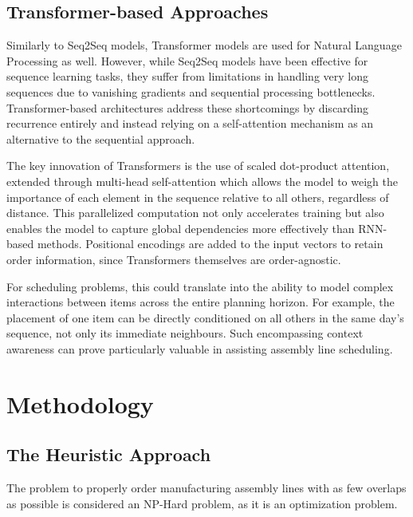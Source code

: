 \documentclass[12pt,a4paper]{report}
\begin{document}
\section{Transformer-based Approaches}

Similarly to Seq2Seq models, Transformer models are used for Natural Language Processing as well. However, while Seq2Seq models have been effective for sequence learning tasks, they suffer from limitations in handling very long sequences due to vanishing gradients and sequential processing bottlenecks. Transformer-based architectures address these shortcomings by discarding recurrence entirely and instead relying on a self-attention mechanism as an alternative to the sequential approach.

The key innovation of Transformers is the use of scaled dot-product attention, extended through multi-head self-attention which allows the model to weigh the importance of each element in the sequence relative to all others, regardless of distance. This parallelized computation not only accelerates training but also enables the model to capture global dependencies more effectively than RNN-based methods. Positional encodings are added to the input vectors to retain order information, since Transformers themselves are order-agnostic.\cite{ref5} 

For scheduling problems, this could translate into the ability to model complex interactions between items across the entire planning horizon. For example, the placement of one item can be directly conditioned on all others in the same day’s sequence, not only its immediate neighbours. Such encompassing context awareness can prove particularly valuable in assisting assembly line scheduling.


\chapter{Methodology}
\section{The Heuristic Approach}

The problem to properly order manufacturing assembly lines with as few overlaps as possible is considered an NP-Hard problem, as it is an optimization problem.
\end{document}
